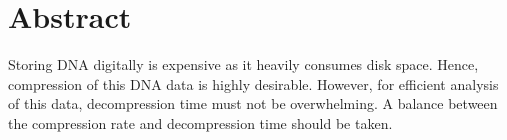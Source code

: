 \chapter*{Abstract}

Storing DNA digitally is expensive as it heavily consumes disk space. Hence, compression of this DNA data is highly desirable. However, for efficient analysis of this data, decompression time must not be overwhelming. A balance between the compression rate and decompression time should be taken.
